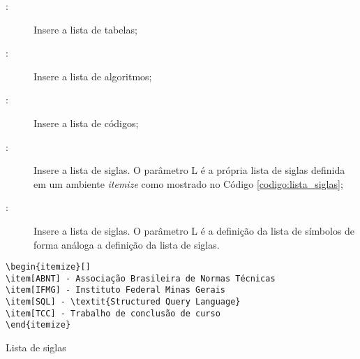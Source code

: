 \begin{description}
\item[:] Insere a lista de tabelas;
\item[:] Insere a lista de algoritmos;
\item[:] Insere a lista de códigos;
\item[:] Insere a lista de siglas. O parâmetro L é a própria lista de siglas definida em um ambiente \textit{itemize} como mostrado no Código \ref{codigo:lista_siglas};
\item[:] Insere a lista de siglas. O parâmetro L é a definição da lista de símbolos de forma análoga a definição da lista de siglas.
\end{description}

\begin{codigo}[!htb]
\begin{Verbatim}
\begin{itemize}[]
\item[ABNT] - Associação Brasileira de Normas Técnicas
\item[IFMG] - Instituto Federal Minas Gerais
\item[SQL] - \textit{Structured Query Language}
\item[TCC] - Trabalho de conclusão de curso
\end{itemize}
\end{Verbatim}
\caption{Lista de siglas} \label{codigo:lista_siglas}
\end{codigo}
